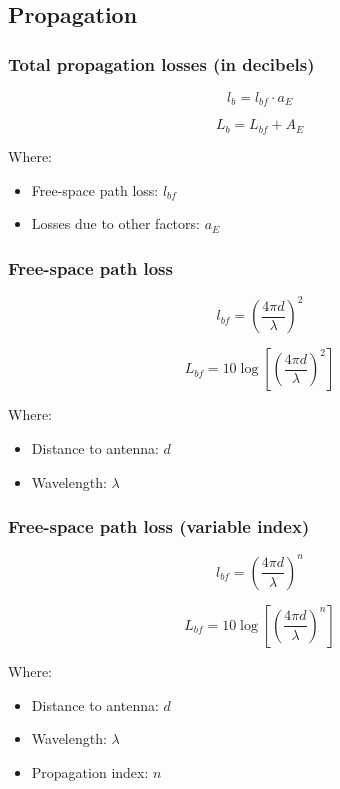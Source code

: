 \documentclass[../main.tex]{subfiles}
\begin{document}
\subsection{Propagation}

\subsubsection{Total propagation losses (in decibels)}

$$
	l_b = l_{bf} \cdot a_E
$$

$$
	L_b = L_{bf} + A_E
$$

Where:

\begin{itemize}
	\item Free-space path loss: $l_{bf}$
	\item Losses due to other factors: $a_E$
\end{itemize}

\subsubsection{Free-space path loss}

$$
	l_{bf} = \left( \frac {4 \pi d} {\lambda} \right)^2
$$

$$
	L_{bf} = 10 \log \left[ \left( \frac {4 \pi d} {\lambda} \right)^2 \right]
$$

Where:

\begin{itemize}
	\item Distance to antenna: $d$
	\item Wavelength: $\lambda$
\end{itemize}

\subsubsection{Free-space path loss (variable index)}

$$
	l_{bf} = \left( \frac {4 \pi d} {\lambda} \right)^n
$$

$$
	L_{bf} = 10 \log \left[ \left( \frac {4 \pi d} {\lambda} \right)^n \right]
$$

Where:

\begin{itemize}
	\item Distance to antenna: $d$
	\item Wavelength: $\lambda$
	\item Propagation index: $n$
\end{itemize}
\end{document}
